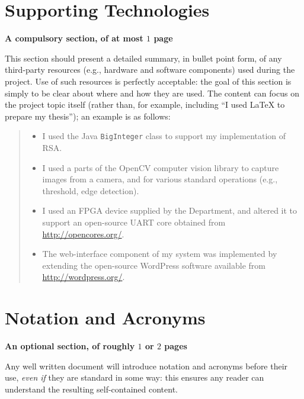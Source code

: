 \documentclass[ %
                    author={Sam Phippen},
                supervisor={Dr. Rafal Bogacz},
                     title={Real time voice activity detectors in noisy personal computing environments},
                  subtitle={},
                    degree={MEng},
                      year={2012} ]{thesis}
\begin{document}

\chapter*{Supporting Technologies}

{\bf A compulsory section, of at most $1$ page}
\vspace{1cm} 

\noindent
This section should present a detailed summary, in bullet point form, of 
any third-party resources (e.g., hardware and software components) used 
during the project.  Use of such resources is perfectly acceptable: the 
goal of this section is simply to be clear about where and how they are 
used.  The content can focus on the project topic itself (rather than, 
for example, including ``I used \mbox{\LaTeX} to prepare my thesis''); 
an example is as follows:

\begin{quote}
\noindent
\begin{itemize}
\item I used the Java {\tt BigInteger} class to support my implementation 
      of RSA.
\item I used a parts of the OpenCV computer vision library to capture 
      images from a camera, and for various standard operations (e.g., 
      threshold, edge detection).
\item I used an FPGA device supplied by the Department, and altered it 
      to support an open-source UART core obtained from 
      \url{http://opencores.org/}.
\item The web-interface component of my system was implemented by 
      extending the open-source WordPress software available from
      \url{http://wordpress.org/}.
\end{itemize}
\end{quote}


\chapter*{Notation and Acronyms}

{\bf An optional section, of roughly $1$ or $2$ pages}
\vspace{1cm} 

\noindent
Any well written document will introduce notation and acronyms before their 
use, {\em even if} they are standard in some way: this ensures any reader 
can understand the resulting self-contained content.  
\end{document}
